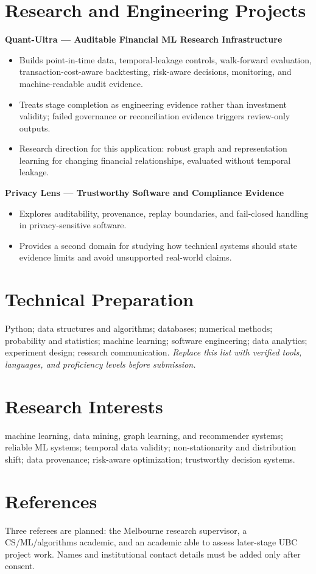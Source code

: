 \documentclass[11pt]{article}
\begin{document}
\section*{Research and Engineering Projects}
\textbf{Quant-Ultra --- Auditable Financial ML Research Infrastructure}
\begin{itemize}
\item Builds point-in-time data, temporal-leakage controls, walk-forward evaluation, transaction-cost-aware backtesting, risk-aware decisions, monitoring, and machine-readable audit evidence.
\item Treats stage completion as engineering evidence rather than investment validity; failed governance or reconciliation evidence triggers review-only outputs.
\item Research direction for this application: robust graph and representation learning for changing financial relationships, evaluated without temporal leakage.
\end{itemize}

\textbf{Privacy Lens --- Trustworthy Software and Compliance Evidence}
\begin{itemize}
\item Explores auditability, provenance, replay boundaries, and fail-closed handling in privacy-sensitive software.
\item Provides a second domain for studying how technical systems should state evidence limits and avoid unsupported real-world claims.
\end{itemize}

\section*{Technical Preparation}
Python; data structures and algorithms; databases; numerical methods; probability and statistics; machine learning; software engineering; data analytics; experiment design; research communication. \textit{Replace this list with verified tools, languages, and proficiency levels before submission.}

\section*{Research Interests}
machine learning, data mining, graph learning, and recommender systems; reliable ML systems; temporal data validity; non-stationarity and distribution shift; data provenance; risk-aware optimization; trustworthy decision systems.

\section*{References}
Three referees are planned: the Melbourne research supervisor, a CS/ML/algorithms academic, and an academic able to assess later-stage UBC project work. Names and institutional contact details must be added only after consent.
\end{document}
